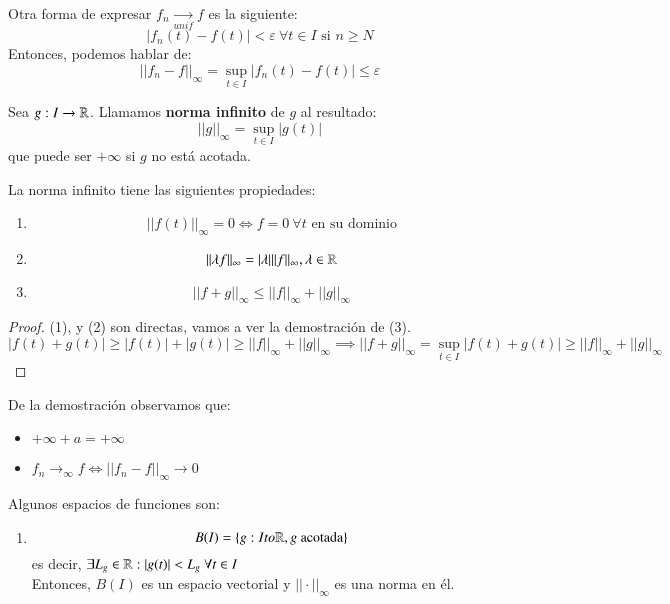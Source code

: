 \begin{obs}
    Otra forma de expresar $f_n \xrightarrow[unif]{} f$ es la siguiente:
    $$
        |f_n(t) - f(t)| < \varepsilon\ \forall t \in I \text{ si } n \geq N
    $$
    Entonces, podemos hablar de:
    $$
        ||f_n - f||_{\infty} = \sup_{t\in I} |f_n(t) - f(t)| \leq \varepsilon
    $$
\end{obs}
\begin{dfn}
    Sea $g: I \to \mathbb{R}$. Llamamos \textbf{norma infinito} de $g$ al resultado:
    $$
        ||g||_{\infty} = \sup_{t\in I} |g(t)|
    $$
    que puede ser $+\infty$ si $g$ no está acotada.
\end{dfn}
\begin{pro}
    La norma infinito tiene las siguientes propiedades:
    \begin{enumerate}
        \item
        $$
            ||f(t)||_{\infty} = 0 \iff f = 0\ \forall t \text{ en su dominio}
        $$
        \item
        $$
            ||\lambda f||_\infty = |\lambda| ||f||_\infty, \lambda \in \mathbb{R}
        $$
        \item
        $$
            ||f + g||_\infty \leq ||f||_\infty + ||g||_\infty
        $$
    \end{enumerate}
\end{pro}
\begin{proof}
    (1), y (2) son directas, vamos a ver la demostración de (3).\\
    $$
        |f(t) + g(t)| \geq |f(t)| + |g(t)| \geq ||f||_\infty + ||g||_\infty \implies ||f + g||_\infty = \sup_{t \in I} |f(t) + g(t)| \geq ||f||_\infty + ||g||_\infty
    $$
\end{proof}
\begin{obs}
    De la demostración observamos que:
    \begin{itemize}
        \item $ +\infty + a = +\infty$
        \item $ f_n \to_\infty f \iff ||f_n - f||_\infty \to 0 $
    \end{itemize}
\end{obs}
\begin{eg}
    Algunos espacios de funciones son:
    \begin{enumerate}
        \item
        $$
            B(I) = \left\{ g : I to \mathbb{R}, g \text{ acotada} \right\}
        $$ es decir, $\exists L_g \in \mathbb{R} : |g(t)| < L_g\ \forall t \in I$\\
        Entonces, $B(I)$ es un espacio vectorial y $||\cdot||_\infty$ es una norma en él.
    \end{enumerate}
\end{eg}

